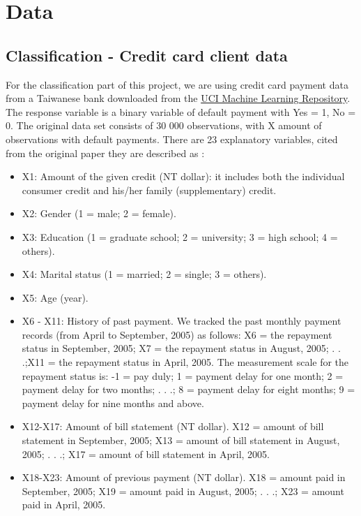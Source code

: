 \documentclass[a4paper, 11pt, twocolumn]{article}
\begin{document}
\section{Data}
\subsection{Classification - Credit card client data}
For the classification part of this project,  we are using credit card payment data from a Taiwanese bank downloaded from the \href{https://archive.ics.uci.edu/ml/datasets/default+of+credit+card+clients}{UCI Machine Learning Repository}. The response variable is a binary variable of default payment with Yes = 1, No = 0.  The original data set consists of 30 000 observations, with X amount of observations with default payments. There are 23 explanatory variables, cited from the original paper they are described as \cite{origarticle}:
\begin{itemize}[leftmargin=5mm, itemsep=0pt,  parsep=1pt]
 \item X1: Amount of the given credit (NT dollar): it includes both the individual consumer credit and his/her family (supplementary) credit.
\item X2: Gender (1 = male; 2 = female).
\item X3: Education (1 = graduate school; 2 = university; 3 = high school; 4 = others).
\item X4: Marital status (1 = married; 2 = single; 3 = others).
\item X5: Age (year).
\item X6 - X11: History of past payment. We tracked the past monthly payment records (from April to September, 2005) as follows: X6 = the repayment status in September, 2005; X7 = the repayment status in August, 2005; . . .;X11 = the repayment status in April, 2005. The measurement scale for the repayment status is: -1 = pay duly; 1 = payment delay for one month; 2 = payment delay for two months; . . .; 8 = payment delay for eight months; 9 = payment delay for nine months and above.
\item X12-X17: Amount of bill statement (NT dollar). X12 = amount of bill statement in September, 2005; X13 = amount of bill statement in August, 2005; . . .; X17 = amount of bill statement in April, 2005.
\item X18-X23: Amount of previous payment (NT dollar). X18 = amount paid in September, 2005; X19 = amount paid in August, 2005; . . .; X23 = amount paid in April, 2005.
\end{itemize}
\end{document}
